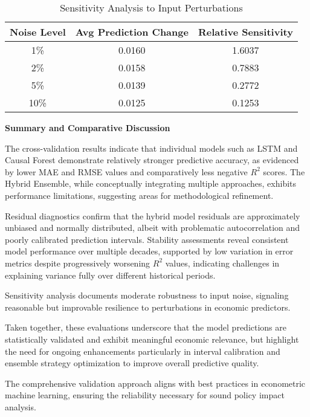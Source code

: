 \vspace{0.3cm} 

\begin{table}[H]
\centering
\small
\caption{Sensitivity Analysis to Input Perturbations}
\label{tab:sensitivity}
\begin{tabular}{|c|c|c|}
\hline
\textbf{Noise Level} & \textbf{Avg Prediction Change} & \textbf{Relative Sensitivity} \\
\hline
1\%   & 0.0160 & 1.6037 \\
2\%   & 0.0158 & 0.7883 \\
5\%   & 0.0139 & 0.2772 \\
10\%  & 0.0125 & 0.1253 \\
\hline
\end{tabular}
\end{table}

\vspace{0.5cm}

\noindent \textbf{Summary and Comparative Discussion}

The cross-validation results indicate that individual models such as LSTM and Causal Forest demonstrate relatively stronger predictive accuracy, as evidenced by lower MAE and RMSE values and comparatively less negative \( R^2 \) scores. The Hybrid Ensemble, while conceptually integrating multiple approaches, exhibits performance limitations, suggesting areas for methodological refinement.

Residual diagnostics confirm that the hybrid model residuals are approximately unbiased and normally distributed, albeit with problematic autocorrelation and poorly calibrated prediction intervals. Stability assessments reveal consistent model performance over multiple decades, supported by low variation in error metrics despite progressively worsening \( R^2 \) values, indicating challenges in explaining variance fully over different historical periods.

Sensitivity analysis documents moderate robustness to input noise, signaling reasonable but improvable resilience to perturbations in economic predictors.

Taken together, these evaluations underscore that the model predictions are statistically validated and exhibit meaningful economic relevance, but highlight the need for ongoing enhancements particularly in interval calibration and ensemble strategy optimization to improve overall predictive quality.

The comprehensive validation approach aligns with best practices in econometric machine learning, ensuring the reliability necessary for sound policy impact analysis.





